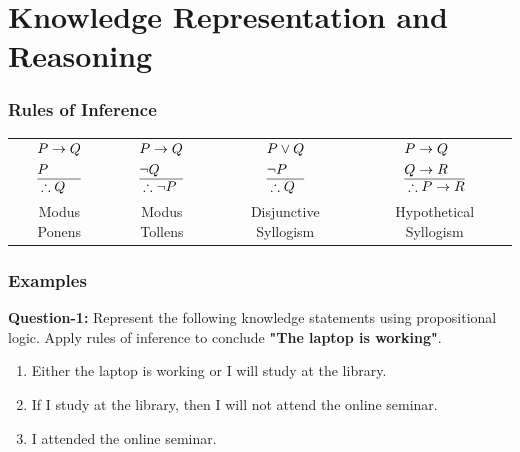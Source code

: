 \chapter{Knowledge Representation and Reasoning}

\subsection*{Rules of Inference}
\vspace{1em}
\begin{tabularx}{\textwidth}{CCCC}
   $\begin{aligned}
   & P \to Q \\
   & P \\\hline
   & \therefore Q \\
\end{aligned}$
&
$\begin{aligned}
   & P \to Q \\
   & \neg Q \\\hline
   & \therefore \neg P \\
\end{aligned}$
&
$\begin{aligned}
   & P \lor Q \\
   & \neg P \\\hline
   & \therefore Q \\
\end{aligned}$
&
$\begin{aligned}
   & P \to Q \\
   & Q \to R \\\hline
   & \therefore P \to R \\
\end{aligned}$
\\
Modus Ponens
&
Modus Tollens
&
Disjunctive Syllogism
&
Hypothetical Syllogism
\end{tabularx}



\subsection*{Examples}
\textbf{Question-1:} Represent the following knowledge statements using propositional logic. Apply rules of inference to conclude \textbf{"The laptop is working"}.
\begin{enumerate}
   \item Either the laptop is working or I will study at the library.
   \item If I study at the library, then I will not attend the online seminar.
   \item I attended the online seminar.
\end{enumerate}


